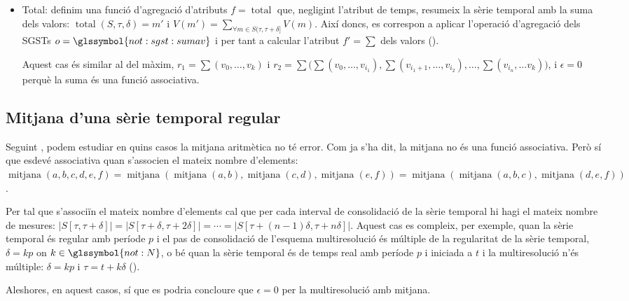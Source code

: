 \begin{itemize}
  \item Total: definim una funció d'agregació d'atributs
    $f=\operatorname{total}$ que, negligint l'atribut de temps,
    resumeix la sèrie temporal amb la suma dels valors:
    $\operatorname{total}(S,\tau,\delta)=m'$  i $V(m') =
    \sum\limits_{\forall m\in S(\tau,\tau+\delta]} V(m)$. Així doncs, es
    correspon a aplicar l'operació d'agregació dels \glspl{SGST}
    $o=\glssymbol{not:sgst:sumav}$ i per tant a calcular l'atribut
    $f'=\sum$ dels valors ().

    Aquest cas és similar al del màxim, $r_1=\sum(v_0,\dotsc, v_k)$ i
    $r_2=\sum\big( \sum(v_0,\dotsc,v_{i_1}),
    \sum(v_{i_1+1},\dotsc,v_{i_2}), \dotsc, \sum(v_{i_n}, \dotsc v_k)
    \big)$, i $\epsilon=0$ perquè la suma és una funció
    associativa.
    

  \end{itemize}


\subsection{Mitjana d'una sèrie temporal regular}

  Seguint , podem estudiar en quins
  casos la mitjana aritmètica no té error. Com ja s'ha dit, la mitjana
  no és una funció associativa. Però sí que esdevé associativa quan
  s'associen el mateix nombre d'elements:
  $\operatorname{mitjana}(a,b,c,d,e,f) = \operatorname{mitjana}(
  \operatorname{mitjana}(a,b), \operatorname{mitjana}(c,d),
  \operatorname{mitjana}(e,f)) = \operatorname{mitjana}(
  \operatorname{mitjana}(a,b,c), \operatorname{mitjana}(d,e,f))$.

  Per tal que s'associïn el mateix nombre d'elements cal que per cada
  interval de consolidació de la sèrie temporal hi hagi el mateix
  nombre de mesures:
  $|S[\tau,\tau+\delta]|=|S[\tau+\delta,\tau+2\delta]|=\dotsb
  = |S[\tau+(n-1)\delta,\tau+n\delta]|$.  Aquest cas es
  compleix, per exemple, quan la sèrie temporal és regular amb període
  $p$ i el pas de consolidació de l'esquema multiresolució és múltiple
  de la regularitat de la sèrie temporal, $\delta = kp$ on
  $k\in\glssymbol{not:N}$, o bé quan la sèrie temporal és de temps
  real amb període $p$ i iniciada a $t$ i la multiresolució n'és
  múltiple: $\delta = kp$ i $\tau = t+k\delta$
  ().

  Aleshores, en aquest casos, sí que es podria concloure que
  $\epsilon=0$ per la multiresolució amb mitjana.



